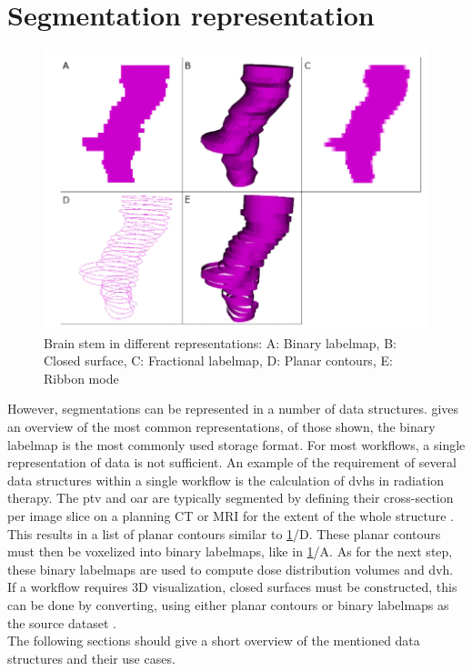 \section{Segmentation representation}
\begin{figure}[h]
	\centerline{
		\includegraphics[scale=0.5]{images/segRep.png}}
	\caption{Brain stem in different representations: A: Binary labelmap, B: Closed surface, C: Fractional labelmap, D: Planar contours, E: Ribbon mode \cite{pinterPolymorphSegmentationRepresentation2019}}\label{fig:segRep}
\end{figure}
\noindent
However, segmentations can be represented in a number of data structures.
 gives an overview of the most common representations, of those shown, the binary labelmap is the most commonly used storage format.
For most workflows, a single representation of data is not sufficient.
An example of the requirement of several data structures within a single workflow is the calculation of \acrfull{dvh}s in radiation therapy.
The \acrfull{ptv} and \acrfull{oar} are typically segmented by defining their cross-section per
image slice on a planning CT or MRI for the extent of the whole structure \cite{burnetDefiningTumourTarget2004}.
This results in a list of planar contours similar to \cref{fig:segRep}/D.
These planar contours must then be voxelized into binary labelmaps, like in \cref{fig:segRep}/A.
As for the next step, these binary labelmaps are used to compute dose distribution volumes and \acrlong{dvh}.
If a workflow requires 3D visualization, closed surfaces must be constructed, this can be done by converting,
using either planar contours or binary labelmaps as the source dataset \cite{pinterPolymorphSegmentationRepresentation2019}.\\
The following sections should give a short overview of the mentioned data structures and their use cases.

